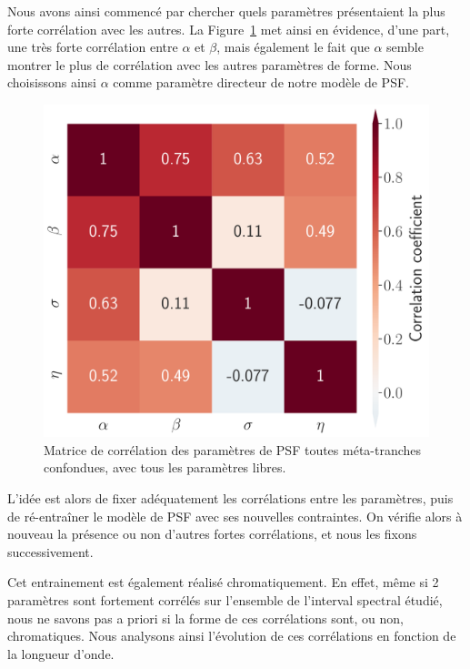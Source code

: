 \documentclass[../main/main.tex]{subfiles}
\begin{document}
Nous avons ainsi commencé par chercher quels paramètres présentaient la
plus forte corrélation avec les autres. La
Figure~\ref{fig:stdcorrmatrix} met ainsi en évidence, d'une part, une très forte
corrélation entre $\alpha$ et $\beta$, mais également le fait que
$\alpha$ semble montrer le plus de corrélation avec les autres
paramètres de forme. Nous choisissons ainsi $\alpha$ comme paramètre
directeur de notre modèle de PSF.

\begin{figure}[ht]
  \begin{minipage}[c]{0.4\textwidth}
    \includegraphics[width=\textwidth]{../figures/06_irf/STD_correlation.pdf}
  \end{minipage}\hfill
  \begin{minipage}[c]{0.53\textwidth}
    \caption[Matrice de corrélation des paramètres de PSF.]{Matrice de
      corrélation des paramètres de PSF toutes méta-tranches confondues,
    avec tous les paramètres libres.}\label{fig:stdcorrmatrix}
  \end{minipage}
\end{figure}

L'idée est alors de fixer adéquatement les corrélations entre les
paramètres, puis de ré-entraîner le modèle de PSF avec ses nouvelles
contraintes. On vérifie alors à nouveau la présence ou non d'autres fortes
corrélations, et nous les fixons successivement.

Cet entrainement est également réalisé chromatiquement. En effet, même
si 2 paramètres sont fortement corrélés sur l'ensemble de l'interval
spectral étudié, nous ne
savons pas a priori si la forme de ces corrélations sont, ou non,
chromatiques. Nous analysons ainsi l'évolution de ces corrélations en
fonction de la longueur d'onde.
\end{document}

